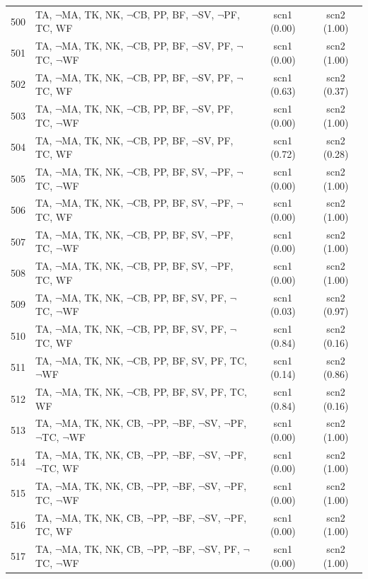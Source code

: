 \documentclass[12pt]{article}
\begin{document}
\begin{longtable}{|l|l|c|c|}
500 & TA, $\neg$MA, TK, NK, $\neg$CB, PP, BF, $\neg$SV, $\neg$PF, TC, WF & scn1 (0.00) & scn2 (1.00)\\
501 & TA, $\neg$MA, TK, NK, $\neg$CB, PP, BF, $\neg$SV, PF, $\neg$TC, $\neg$WF & scn1 (0.00) & scn2 (1.00)\\
502 & TA, $\neg$MA, TK, NK, $\neg$CB, PP, BF, $\neg$SV, PF, $\neg$TC, WF & scn1 (0.63) & scn2 (0.37)\\
503 & TA, $\neg$MA, TK, NK, $\neg$CB, PP, BF, $\neg$SV, PF, TC, $\neg$WF & scn1 (0.00) & scn2 (1.00)\\
504 & TA, $\neg$MA, TK, NK, $\neg$CB, PP, BF, $\neg$SV, PF, TC, WF & scn1 (0.72) & scn2 (0.28)\\
505 & TA, $\neg$MA, TK, NK, $\neg$CB, PP, BF, SV, $\neg$PF, $\neg$TC, $\neg$WF & scn1 (0.00) & scn2 (1.00)\\
506 & TA, $\neg$MA, TK, NK, $\neg$CB, PP, BF, SV, $\neg$PF, $\neg$TC, WF & scn1 (0.00) & scn2 (1.00)\\
507 & TA, $\neg$MA, TK, NK, $\neg$CB, PP, BF, SV, $\neg$PF, TC, $\neg$WF & scn1 (0.00) & scn2 (1.00)\\
508 & TA, $\neg$MA, TK, NK, $\neg$CB, PP, BF, SV, $\neg$PF, TC, WF & scn1 (0.00) & scn2 (1.00)\\
509 & TA, $\neg$MA, TK, NK, $\neg$CB, PP, BF, SV, PF, $\neg$TC, $\neg$WF & scn1 (0.03) & scn2 (0.97)\\
510 & TA, $\neg$MA, TK, NK, $\neg$CB, PP, BF, SV, PF, $\neg$TC, WF & scn1 (0.84) & scn2 (0.16)\\
511 & TA, $\neg$MA, TK, NK, $\neg$CB, PP, BF, SV, PF, TC, $\neg$WF & scn1 (0.14) & scn2 (0.86)\\
512 & TA, $\neg$MA, TK, NK, $\neg$CB, PP, BF, SV, PF, TC, WF & scn1 (0.84) & scn2 (0.16)\\
513 & TA, $\neg$MA, TK, NK, CB, $\neg$PP, $\neg$BF, $\neg$SV, $\neg$PF, $\neg$TC, $\neg$WF & scn1 (0.00) & scn2 (1.00)\\
514 & TA, $\neg$MA, TK, NK, CB, $\neg$PP, $\neg$BF, $\neg$SV, $\neg$PF, $\neg$TC, WF & scn1 (0.00) & scn2 (1.00)\\
515 & TA, $\neg$MA, TK, NK, CB, $\neg$PP, $\neg$BF, $\neg$SV, $\neg$PF, TC, $\neg$WF & scn1 (0.00) & scn2 (1.00)\\
516 & TA, $\neg$MA, TK, NK, CB, $\neg$PP, $\neg$BF, $\neg$SV, $\neg$PF, TC, WF & scn1 (0.00) & scn2 (1.00)\\
517 & TA, $\neg$MA, TK, NK, CB, $\neg$PP, $\neg$BF, $\neg$SV, PF, $\neg$TC, $\neg$WF & scn1 (0.00) & scn2 (1.00)\\

\end{longtable}
\end{document}
